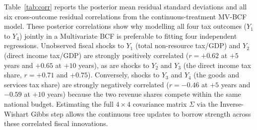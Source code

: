 \documentclass[11pt,a4paper]{article}
\begin{document}
Table~\ref{tab:corr} reports the posterior mean residual standard deviations and all six cross-outcome residual correlations from the continuous-treatment MV-BCF model. These posterior correlations show why modelling all four tax outcomes ($Y_1$ to $Y_4$) jointly in a Multivariate BCF is preferable to fitting four independent regressions. Unobserved fiscal shocks to $Y_1$ (total non-resource tax/GDP) and $Y_2$ (direct income tax/GDP) are strongly positively correlated ($r = +0.62$ at $+5$ years and $+0.65$ at $+10$ years), as are shocks to $Y_2$ and $Y_3$ (the direct income tax share, $r = +0.71$ and $+0.75$). Conversely, shocks to $Y_3$ and $Y_4$ (the goods and services tax share) are strongly negatively correlated ($r = -0.46$ at $+5$ years and $-0.59$ at $+10$ years) because the two revenue shares compete within the same national budget. Estimating the full $4 \times 4$ covariance matrix $\Sigma$ via the Inverse-Wishart Gibbs step allows the continuous tree updates to borrow strength across these correlated fiscal innovations.
\end{document}
